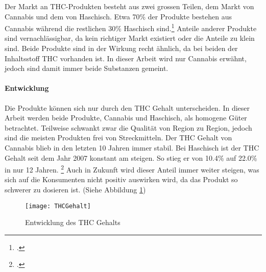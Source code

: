 \documentclass[../main.tex]{subfiles}
\begin{document}
	\noindent
	Der Markt an THC-Produkten besteht aus zwei grossen Teilen, dem Markt von Cannabis und dem von Haschisch.
	Etwa 70\% der Produkte bestehen aus Cannabis während die restlichen 30\% Haschisch sind.\footcite{zobel} 
	Anteile anderer Produkte sind vernachlässigbar, da kein richtiger Markt existiert oder die Anteile zu klein sind.
	Beide Produkte sind in der Wirkung recht ähnlich, da bei beiden der Inhaltsstoff THC vorhanden ist.
	In dieser Arbeit wird nur Cannabis erwähnt, jedoch sind damit immer beide Substanzen gemeint.
	
	\paragraph{Entwicklung}
	Die Produkte können sich nur durch den THC Gehalt unterscheiden.
	In dieser Arbeit werden beide Produkte, Cannabis und Haschisch, als homogene Güter betrachtet.
	Teilweise schwankt zwar die Qualität von Region zu Region, jedoch sind die meisten Produkten frei von Streckmitteln.
	Der THC Gehalt von Cannabis blieb in den letzten 10 Jahren immer stabil.
	Bei Haschisch ist der THC Gehalt seit dem Jahr 2007 konstant am steigen.
	So stieg er von 10.4\% auf 22.0\% in nur 12 Jahren. \footcite{sgrm}
	Auch in Zukunft wird dieser Anteil immer weiter steigen, was sich auf die Konsumenten nicht positiv auswirken wird, da das Produkt so schwerer zu dosieren ist.
	(Siehe Abbildung \ref{fig:thcdevelopment})
	
	\noindent	 
	\begin{figure}[H]
		\centering
		\texttt{[image: THCGehalt]}
		\captionsetup{font=small}
		\caption[Entwicklung des THC Gehalts]{Entwicklung des THC Gehalts\protect\footnotemark}		
		\label{fig:thcdevelopment}
	\end{figure}
	
	
	
\end{document}
